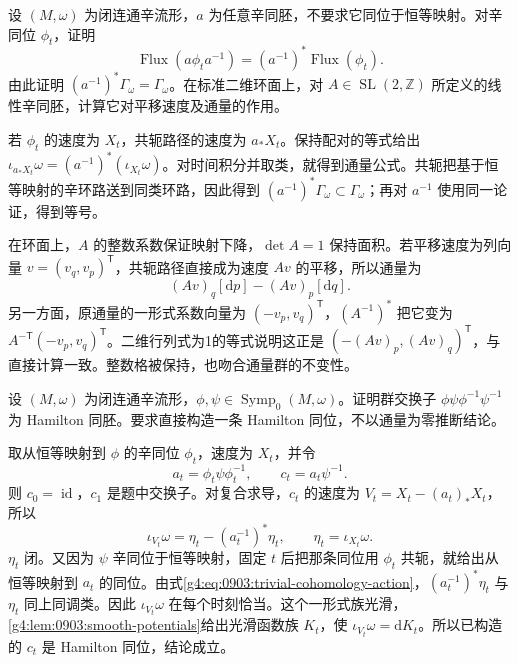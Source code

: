 \begin{exercise}\label{g4:ex:0903:flux-conjugation}
	设 \((M,\omega)\) 为闭连通辛流形，\(a\) 为任意辛同胚，不要求它同位于恒等映射。对辛同位 \(\phi_t\)，证明
	\[
		\operatorname{Flux}(a\phi_ta^{-1})
		=(a^{-1})^*\operatorname{Flux}(\phi_t).
	\]
	由此证明 \((a^{-1})^*\Gamma_\omega=\Gamma_\omega\)。在标准二维环面上，对 \(A\in\operatorname{SL}(2,\mathbb Z)\) 所定义的线性辛同胚，计算它对平移速度及通量的作用。
\end{exercise}
\begin{solution}
	若 \(\phi_t\) 的速度为 \(X_t\)，共轭路径的速度为 \(a_*X_t\)。保持配对的等式给出 \(\iota_{a_*X_t}\omega=(a^{-1})^*(\iota_{X_t}\omega)\)。对时间积分并取类，就得到通量公式。共轭把基于恒等映射的辛环路送到同类环路，因此得到 \((a^{-1})^*\Gamma_\omega\subset\Gamma_\omega\)；再对 \(a^{-1}\) 使用同一论证，得到等号。

	在环面上，\(A\) 的整数系数保证映射下降，\(\det A=1\) 保持面积。若平移速度为列向量 \(v=(v_q,v_p)^{\mathsf T}\)，共轭路径直接成为速度 \(Av\) 的平移，所以通量为
	\[
		(Av)_q[\mathrm{d}p]-(Av)_p[\mathrm{d}q].
	\]
	另一方面，原通量的一形式系数向量为 \((-v_p,v_q)^{\mathsf T}\)，\((A^{-1})^*\) 把它变为 \(A^{-\mathsf T}(-v_p,v_q)^{\mathsf T}\)。二维行列式为1的等式说明这正是 \((-(Av)_p,(Av)_q)^{\mathsf T}\)，与直接计算一致。整数格被保持，也吻合通量群的不变性。
\end{solution}

\begin{exercise}\label{g4:ex:0903:commutator-hamiltonian}
	设 \((M,\omega)\) 为闭连通辛流形，\(\phi,\psi\in\operatorname{Symp}_0(M,\omega)\)。证明群交换子 \(\phi\psi\phi^{-1}\psi^{-1}\) 为 Hamilton 同胚。要求直接构造一条 Hamilton 同位，不以通量为零推断结论。
\end{exercise}
\begin{solution}
	取从恒等映射到 \(\phi\) 的辛同位 \(\phi_t\)，速度为 \(X_t\)，并令
	\[
		a_t=\phi_t\psi\phi_t^{-1},\qquad
		c_t=a_t\psi^{-1}.
	\]
	则 \(c_0=\operatorname{id}\)，\(c_1\) 是题中交换子。对复合求导，\(c_t\) 的速度为 \(V_t=X_t-(a_t)_*X_t\)，所以
	\[
		\iota_{V_t}\omega=\eta_t-(a_t^{-1})^*\eta_t,
		\qquad \eta_t=\iota_{X_t}\omega.
	\]
	\(\eta_t\) 闭。又因为 \(\psi\) 辛同位于恒等映射，固定 \(t\) 后把那条同位用 \(\phi_t\) 共轭，就给出从恒等映射到 \(a_t\) 的同位。由式\eqref{g4:eq:0903:trivial-cohomology-action}，\((a_t^{-1})^*\eta_t\) 与 \(\eta_t\) 同上同调类。因此 \(\iota_{V_t}\omega\) 在每个时刻恰当。这个一形式族光滑，\cref{g4:lem:0903:smooth-potentials}给出光滑函数族 \(K_t\)，使 \(\iota_{V_t}\omega=\mathrm{d}K_t\)。所以已构造的 \(c_t\) 是 Hamilton 同位，结论成立。
\end{solution}


